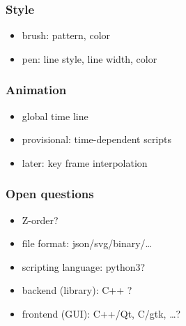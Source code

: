 \documentclass{beamer}
\begin{document}
  \begin{frame}[t]\frametitle{Style}
    \begin{itemize}
      \item brush: pattern, color
      \item pen: line style, line width, color
    \end{itemize}
  \end{frame}

  \begin{frame}[t]\frametitle{Animation}
    \begin{itemize}
      \item global time line
      \item provisional: time-dependent scripts
      \item later: key frame interpolation
    \end{itemize}
  \end{frame}

  \begin{frame}[t]\frametitle{Open questions}
    \begin{itemize}
      \item Z-order?
      \item file format: json/svg/binary/\dots
      \item scripting language: python3?
      \item backend (library): C++ ?
      \item frontend (GUI): C++/Qt, C/gtk, \dots ?
    \end{itemize}
  \end{frame}
\end{document}
